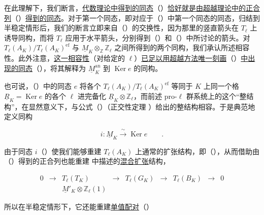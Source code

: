 \noindent
在此理解下，我们断言，\underline{代数理论中得到的同态}（）\underline{恰好就是由超越理论中的正合列}（）\underline{得到的同态}。对于第一个同态，即对应于（）中第一个同态的同态，归结到半稳定情形后，我们的断言立即来自（）的交换性，因为那里的竖直箭头在 $T_\ell$ 上诱导同构，而将 $T_\ell$ 应用于水平箭头，分别得到（）和（）中所讨论的箭头。对 $T_\ell(A_K)/T_\ell(A_K)^{\mathrm{ef}}$ 与 $\underline M_K\otimes_{\mathbb Z}\mathbb Z_\ell$ 之间所得到的两个同构，我们承认所述相容性。此外注意，\underline{这一相容性}（对给定的 $\ell$）\underline{已足以用超越方法唯一刻画}（）\underline{中出现的同态}（），将其解释为 $\underline M_K^{\mathrm{an}}$ 到 $\operatorname{Ker}e$ 的同构。

也可说，（）中的同态 $e$ 将各个 $T_\ell(A_K)/T_\ell(A_K)^{\mathrm{ef}}$ 等同于 $K$ 上同一个格 $\underline R_K=\operatorname{Ker}e$ 的各个 $\ell$ 进完备化 $\underline R_K\otimes\mathbb Z_\ell$，而前述 pro-$\ell$ 群系统上的这个“整结构”，在显然意义下，与公式（）（正交性定理 ）给出的整结构相容。于是典范地定义同构

\begin{equation*}
 i:\underline M_K\xrightarrow{\ \sim\ }\operatorname{Ker}e
 \qquad .
\end{equation*}

由于同态 $i$（）使我们能够重建 $T_\ell(A_K)$ 上通常的扩张结构，即（），从而借助由（）得到的正合列也能重建  中描述的\underline{混合扩张}结构，

\begin{equation*}
\begin{array}{ccccccccc}
0&\longrightarrow&T_\ell(T_K)&\longrightarrow&T_\ell(G_K)
 &\longrightarrow&T_\ell(B_K)&\longrightarrow&0\\[5ex]
 &&\underline M'_K\otimes\mathbb Z_\ell(1)&&&&&&
\end{array}
\end{equation*}

\noindent
所以在半稳定情形下，它还能重建\underline{单值配对}（）

